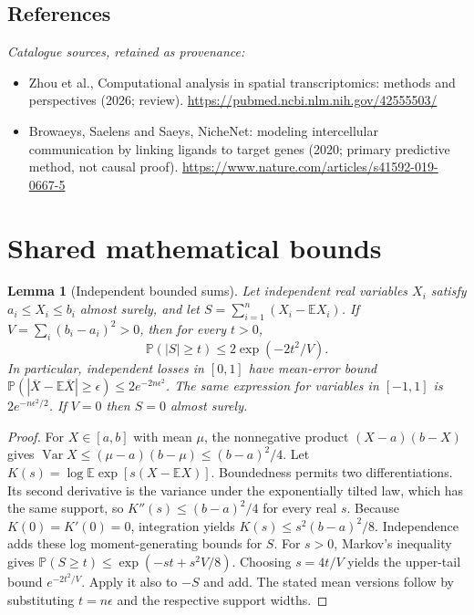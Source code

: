 \documentclass[11pt]{article}
\newcommand{\E}{\mathbb E}
\newcommand{\Prob}{\mathbb P}
\DeclareMathOperator{\Var}{Var}
\providecommand{\E}{\mathbb E}
\providecommand{\Prob}{\mathbb P}
\providecommand{\Var}{\operatorname{Var}}
\newtheorem{sharedlemma}{Lemma}[section]
\begin{document}
\subsection{References}
\noindent\emph{Catalogue sources, retained as provenance:}
\begin{itemize}
\item Zhou et al., Computational analysis in spatial transcriptomics: methods and perspectives (2026; review). \url{https://pubmed.ncbi.nlm.nih.gov/42555503/}
\item Browaeys, Saelens and Saeys, NicheNet: modeling intercellular communication by linking ligands to target genes (2020; primary predictive method, not causal proof). \url{https://www.nature.com/articles/s41592-019-0667-5}
\end{itemize}
\clearpage


\appendix
\section{Shared mathematical bounds}\label{app:bounds}
\begin{sharedlemma}[Independent bounded sums]\label{lem:bounded}
Let independent real variables $X_i$ satisfy $a_i\leq X_i\leq b_i$ almost surely,
and let $S=\sum_{i=1}^n(X_i-\E X_i)$. If
$V=\sum_i(b_i-a_i)^2>0$, then for every $t>0$,
\[
 \Prob(|S|\geq t)\leq 2\exp(-2t^2/V).
\]
In particular, independent losses in $[0,1]$ have mean-error bound
$\Prob(|\overline X-\E\overline X|\geq\epsilon)
\leq2e^{-2n\epsilon^2}$. The same expression for variables in $[-1,1]$
is $2e^{-n\epsilon^2/2}$. If $V=0$ then $S=0$ almost surely.
\end{sharedlemma}
\begin{proof}
For $X\in[a,b]$ with mean $\mu$, the nonnegative product
$(X-a)(b-X)$ gives
$\Var X\leq(\mu-a)(b-\mu)\leq(b-a)^2/4$.
Let $K(s)=\log\E\exp[s(X-\E X)]$.
Boundedness permits two differentiations. Its second derivative is the variance
under the exponentially tilted law, which has the same support, so
$K''(s)\leq(b-a)^2/4$ for every real $s$.
Because $K(0)=K'(0)=0$, integration yields
$K(s)\leq s^2(b-a)^2/8$.
Independence adds these log moment-generating bounds for $S$.
For $s>0$, Markov's inequality gives
$\Prob(S\geq t)\leq\exp(-st+s^2V/8)$.
Choosing $s=4t/V$ yields the upper-tail bound $e^{-2t^2/V}$.
Apply it also to $-S$ and add. The stated mean versions follow by substituting
$t=n\epsilon$ and the respective support widths.
\end{proof}
\end{document}
